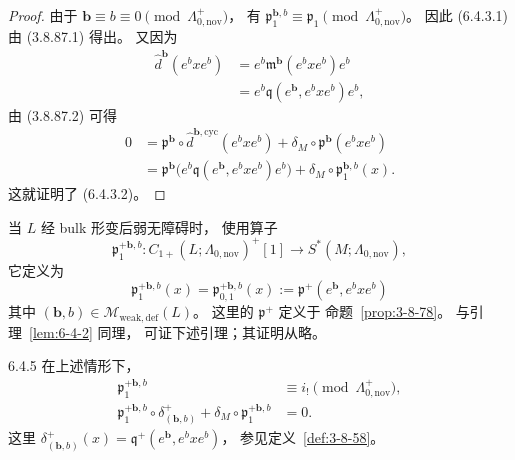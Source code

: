 \begin{proof}
由于 $\boldsymbol b\equiv b\equiv0
\pmod{\Lambda_{0,\mathrm{nov}}^+}$，
有 $\mathfrak p_1^{\boldsymbol b,b}
\equiv\mathfrak p_1
\pmod{\Lambda_{0,\mathrm{nov}}^+}$。
因此 (6.4.3.1) 由 (3.8.87.1) 得出。
又因为
\[
\begin{aligned}
\widehat d^{\boldsymbol b}(e^bxe^b)
&=e^b\mathfrak m^{\boldsymbol b}(e^bxe^b)e^b\\
&=e^b\mathfrak q(e^{\boldsymbol b},e^bxe^b)e^b,
\end{aligned}
\]
由 (3.8.87.2) 可得
\[
\begin{aligned}
0
&=\mathfrak p^{\boldsymbol b}
\circ\widehat d^{\boldsymbol b,\mathrm{cyc}}(e^bxe^b)
+\delta_M\circ\mathfrak p^{\boldsymbol b}(e^bxe^b)\\
&=\mathfrak p^{\boldsymbol b}
\bigl(e^b\mathfrak q(e^{\boldsymbol b},e^bxe^b)e^b\bigr)
+\delta_M\circ\mathfrak p_1^{\boldsymbol b,b}(x).
\end{aligned}
\]
这就证明了 (6.4.3.2)。
\end{proof}

当 $L$ 经 bulk 形变后弱无障碍时，
使用算子
\[
\mathfrak p_1^{+\boldsymbol b,b}\colon
C_{1+}(L;\Lambda_{0,\mathrm{nov}})^+[1]
\longrightarrow S^*(M;\Lambda_{0,\mathrm{nov}}),
\]
它定义为
\begin{equation}
\mathfrak p_1^{+\boldsymbol b,b}(x)
=\mathfrak p_{0,1}^{+\boldsymbol b,b}(x)
:=\mathfrak p^+(e^{\boldsymbol b},e^bxe^b)
\tag{6.4.4}\label{eq:6-4-4}
\end{equation}
其中 $(\boldsymbol b,b)
\in\mathcal M_{\mathrm{weak,def}}(L)$。
这里的 $\mathfrak p^+$ 定义于
命题~\ref{prop:3-8-78}。
与引理~\ref{lem:6-4-2} 同理，
可证下述引理；其证明从略。

\begin{lemma}{6.4.5}\label{lem:6-4-5}
在上述情形下，
\begin{align}
\mathfrak p_1^{+\boldsymbol b,b}
&\equiv i_!\pmod{\Lambda_{0,\mathrm{nov}}^+},
\tag{6.4.6.1}\label{eq:6-4-6-1}\\
\mathfrak p_1^{+\boldsymbol b,b}
\circ\delta_{(\boldsymbol b,b)}^+
+\delta_M\circ\mathfrak p_1^{+\boldsymbol b,b}
&=0.
\tag{6.4.6.2}\label{eq:6-4-6-2}
\end{align}
这里 $\delta_{(\boldsymbol b,b)}^+(x)
=\mathfrak q^+(e^{\boldsymbol b},e^bxe^b)$，
参见定义~\ref{def:3-8-58}。
\end{lemma}

